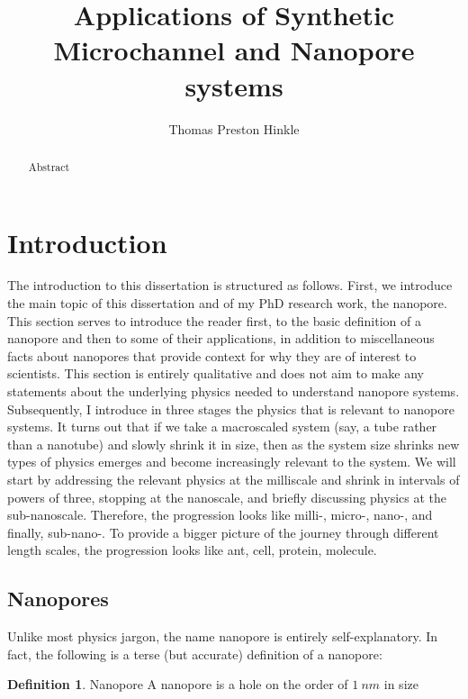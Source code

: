 \documentclass[a4paper,10pt]{article}
\title{Applications of Synthetic Microchannel and Nanopore systems}
\author{Thomas Preston Hinkle}
\theoremstyle{definition}
\newtheorem{definition}{Definition}[section]
\theoremstyle{remark}
\begin{document}
\maketitle

\begin{abstract}
Abstract

\end{abstract}


 


\section{Introduction}

The introduction to this dissertation is structured as follows. First, we introduce the main topic of this dissertation and of my PhD research work, the nanopore. This section serves to introduce the reader first, to the basic definition of a nanopore and then to some of their applications, in addition to miscellaneous facts about nanopores that provide context for why they are of interest to scientists. This section is entirely qualitative and does not aim to make any statements about the underlying physics needed to understand nanopore systems. Subsequently, I introduce in three stages the physics that is relevant to nanopore systems. It turns out that if we take a macroscaled system (say, a tube rather than a nanotube) and slowly shrink it in size, then as the system size shrinks new types of physics emerges and become increasingly relevant to the system. We will start by addressing the relevant physics at the milliscale and shrink in intervals of powers of three, stopping at the nanoscale, and briefly discussing physics at the sub-nanoscale. Therefore, the progression looks like milli-, micro-, nano-, and finally, sub-nano-. To provide a bigger picture of the journey through different length scales, the progression looks like ant, cell, protein, molecule.

\subsection{Nanopores}

Unlike most physics jargon, the name nanopore is entirely self-explanatory. In fact, the following is a terse (but accurate) definition of a nanopore:

\theoremstyle{definition}
\begin{definition}{Nanopore}
A nanopore is a hole on the order of $\SI{1}{nm}$ in size
\label{def:1}
\end{definition}
\end{document}
